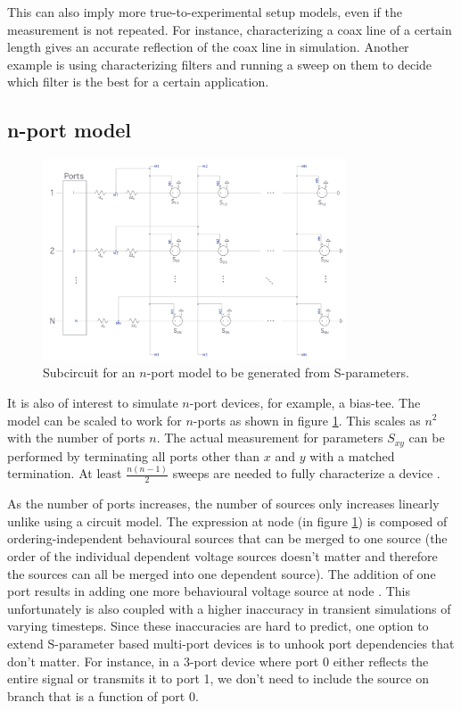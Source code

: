This can also imply more true-to-experimental setup models, even if the measurement is not repeated.
For instance, characterizing a coax line of a certain length gives an accurate reflection of the coax line
in simulation. Another example is using characterizing filters and running a sweep on them to
decide which filter is the best for a certain application.

\subsection{n-port model}

\begin{figure}
    \centering
    \includegraphics[width=0.8\textwidth]{figs/nport.png}
    \caption{Subcircuit for an $n$-port model to be generated from S-parameters.}
    \label{fig:nport}
\end{figure}

It is also of interest to simulate $n$-port devices, for example, a bias-tee. 
The model can be
scaled to work for $n$-ports as shown in figure \ref{fig:nport}. This scales as $n^2$ with
the number of ports $n$. The actual measurement for parameters $S_{xy}$ can be performed 
by terminating all ports other than $x$ and $y$ with a matched termination. At least
$\frac{n(n-1)}{2}$ sweeps are needed to fully characterize a device \cite{measuring_nport}.

As the number of
ports increases, the number of sources only increases linearly unlike using a circuit 
model. The expression at node  (in figure \ref{fig:nport}) is composed of 
ordering-independent behavioural
sources that can be merged to one source (the order of the individual dependent voltage sources doesn't 
matter and 
therefore the sources can all be merged into one dependent source). The addition of one port results in
adding one more behavioural voltage source at node . 
This unfortunately is also coupled with a higher inaccuracy in transient simulations
of varying timesteps. Since these inaccuracies are hard to predict, one option to
extend S-parameter based multi-port devices is to unhook port dependencies that don't
matter. For instance, in a 3-port device where port 0 either reflects the entire
signal or transmits it to port 1, we don't need to include the source on branch 
that is a function of port 0.

